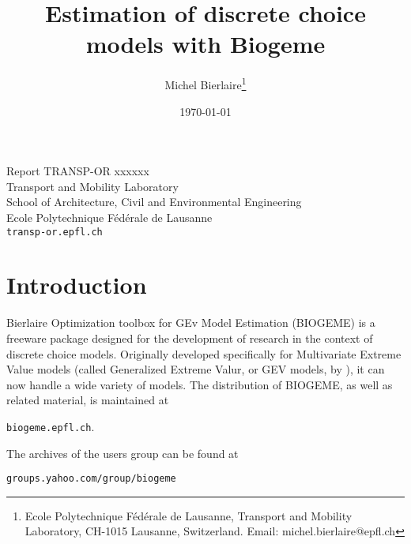 \documentclass[12pt]{memoir}
\title{Estimation of discrete choice models with Biogeme}
\author{Michel Bierlaire\thanks{Ecole Polytechnique F\'ed\'erale de Lausanne, Transport and Mobility Laboratory, CH-1015 Lausanne,
Switzerland. Email: michel.bierlaire@epfl.ch}}
\date{\today}
\begin{document}

\newcommand{\prob}{\operatorname{Pr}}
\newcommand{\expect}{\operatorname{E}}
\newcommand{\req}[1]{(\ref{#1})}
\newcommand{\BIOGEME}{Biogeme~2.4}
\newcommand{\BIOSIM}{Biosim~2.4}
\newcommand{\PBIOGEME}{PythonBiogeme~2.4}


\newcommand{\paramitem}[1]{\texttt{#1}\index{default.par!#1}}
\newcommand{\specitem}[1]{\texttt{[#1]}\index{Model specification file!#1}}
\newcommand{\routeitem}[1]{\texttt{[#1]}\index{BIOROUTE!#1}}
\newcommand{\fileitem}[1]{\texttt{#1}\index{Files!#1}}

\newcommand{\C}{\mathcal{C}}
\newcommand{\R}{\mathbb{R}}
\renewcommand{\L}{\mathcal{L}}
\maketitle

\vspace{2cm}

\begin{center}
\small Report TRANSP-OR xxxxxx \\ Transport and Mobility Laboratory \\ School of Architecture, Civil and Environmental Engineering \\ Ecole Polytechnique F\'ed\'erale de Lausanne \\ \verb+transp-or.epfl.ch+
\end{center}

\clearpage


\tableofcontents




\chapter{Introduction}

Bierlaire Optimization toolbox for GEv Model Estimation (BIOGEME) is a
freeware package designed for the development of research in the context of discrete
choice models. Originally developed specifically for Multivariate  Extreme Value models   (called Generalized Extreme Valur, or GEV models, by \cite{McFa78}), it can now handle a wide variety of models. The distribution of BIOGEME, as well as related material, is maintained at
\begin{center}
\texttt{biogeme.epfl.ch}.
\end{center}
The archives of the users group  can be found at
\begin{center}
\texttt{groups.yahoo.com/group/biogeme}
\end{center}
\end{document}
